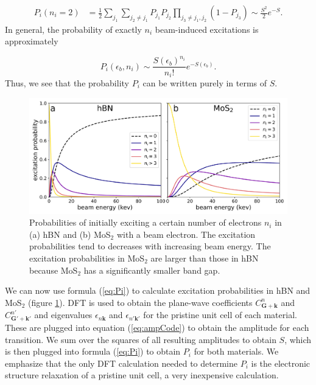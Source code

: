 \documentclass{article}
\begin{document}
\begin{equation}
\begin{aligned}
  P_i(n_i=2)
  &=
  \frac{1}{2} \sum_{j_1} \sum_{j_2\neq j_1} P_{j_1} P_{j_2}
  \prod_{j_3\neq j_1,j_2} (1 - P_{j_3})
  \sim
  \frac{S^2}{2}e^{-S}.
\end{aligned}
\end{equation}
%
In general, the probability of exactly $n_i$ beam-induced excitations is
approximately

\begin{equation}
  P_i(\epsilon_b, n_i)
  \sim
  \frac{S(\epsilon_b)^{n_i}}{n_i!}
  e^{-S(\epsilon_b)}.
  \label{eq:Pi}
\end{equation}
%
Thus, we see that the probability $P_i$ can be written purely in terms of $S$.

\begin{figure}
  \centering
  \includegraphics[width=.9\textwidth]{fig3.pdf}
  \caption{
    Probabilities of initially exciting a certain number of electrons $n_i$ in
    (a) hBN and (b) MoS$_2$ with a beam electron.
    The excitation probabilities tend to decreases with increasing beam energy.
    The excitation probabilities in MoS$_2$ are larger than those in hBN
    because MoS$_2$ has a significantly smaller band gap.
  } 
  \label{fig:Pi}
\end{figure}

We can now use formula (\ref{eq:Pi}) to calculate excitation probabilities in
hBN and MoS$_2$ (figure \ref{fig:Pi}).
DFT is used to obtain the plane-wave coefficients $C_{\mathbf{G+k}}^n$ and
$C_{\mathbf{G'+k'}}^{n'}$ and eigenvalues $\epsilon_{n\mathbf{k}}$ and
$\epsilon_{n'\mathbf{k'}}$ for the pristine unit cell of each material.
These are plugged into equation (\ref{eq:ampCode}) to obtain the amplitude for
each transition.
We sum over the squares of all resulting amplitudes to obtain $S$, which is
then plugged into formula (\ref{eq:Pi}) to obtain $P_i$ for both materials.
We emphasize that the only DFT calculation needed to determine $P_i$ is the
electronic structure relaxation of a pristine unit cell, a very inexpensive
calculation.
\end{document}
